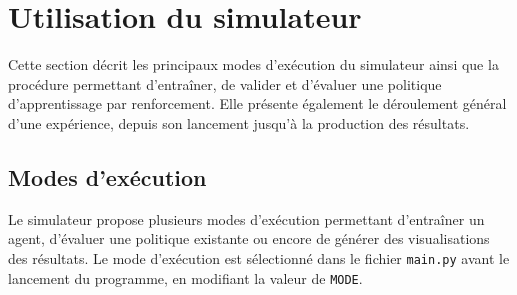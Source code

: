 \section{Utilisation du simulateur}

\noindent Cette section décrit les principaux modes d'exécution du simulateur ainsi que la procédure permettant d'entraîner, de valider et d'évaluer une politique d'apprentissage par renforcement. Elle présente également le déroulement général d'une expérience, depuis son lancement jusqu'à la production des résultats.

\subsection{Modes d'exécution}

\noindent Le simulateur propose plusieurs modes d'exécution permettant d'entraîner un agent, d'évaluer une politique existante ou encore de générer des visualisations des résultats. Le mode d'exécution est sélectionné dans le fichier \texttt{main.py} avant le lancement du programme, en modifiant la valeur de \texttt{MODE}.

